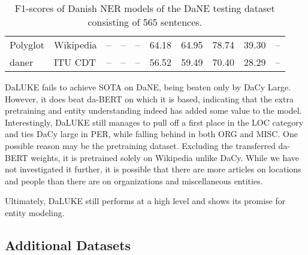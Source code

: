 \documentclass[main.tex]{subfiles}
\begin{document}
\begin{table}[H]
\begin{center}
\begin{tabular}{l l | c c c c | c c c c}
                        Polyglot      & Wikipedia & --             & --             & --             & 64.18                        & 64.95          & 78.74          & 39.30          & -- \\
                        daner         & ITU CDT   & --             & --             & --             & 56.52                        & 59.49          & 70.40          & 28.29          & -- \\
                \end{tabular}
        \end{center}
        \caption{F1\pro-scores of Danish NER models of the DaNE testing dataset consisting of 565 sentences.}
        \label{tab:DaNE}
\end{table}\noindent
DaLUKE fails to achieve SOTA on DaNE, being beaten only by DaCy Large.
However, it does beat da-BERT on which it is based, indicating that the extra pretraining and entity understanding indeed has added some value to the model.
Interestingly, DaLUKE still manages to pull off a first place in the LOC category and ties DaCy large in PER, while falling behind in both ORG and MISC.
One possible reason may be the pretraining dataset.
Excluding the transferred da-BERT weights, it is pretrained solely on Wikipedia unlike DaCy.
While we have not investigated it further, it is possible that there are more articles on locations and people than there are on organizations and miscellaneous entities.

Ultimately, DaLUKE still performs at a high level and shows its promise for entity modeling.

\subsection{Additional Datasets}



\end{document}
